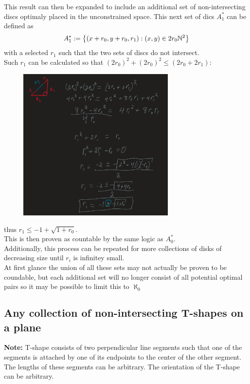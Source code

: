 \documentclass[]{article}
\newcommand{\N}{\mathbb{N}}
\begin{document}
\newpage
This result can then be expanded to include an additional set of non-intersecting discs 
optimaly placed in the unconstrained space. 
This next set of dics $A_1^*$ can be defined as
\begin{displaymath}
	A_1^* := \qty{(x + r_0, y + r_0, r_1) : (x,y) \in 2 r_0 \N^2}
\end{displaymath}
with a selected $r_1$ such that the two sets of discs do not intersect.\\
Such $r_1$ can be calculated so that $(2r_0)^2 + (2r_0)^2 \leq (2r_0 + 2 r_1)$:
\begin{figure}[h]
	\centering
	\includegraphics[width=0.7\textwidth]{fig/pblm4b_1.png}
\end{figure}
thus $r_1 \leq -1 + \sqrt{1 + r_0}$.\\
This is then proven as countable by the same logic as $A_0^*$.\\
Additionally, this process can be repeated for more collections of disks of decreasing size 
until $r_i$ is infinitey small.\\
At first glance the union of all these sets may not actually be proven to be coundable, 
but each additional set will no longer consist of all potential optimal pairs so it 
may be possible to limit this to $\aleph_0$



\newpage
\subsection{Any collection of non-intersecting T-shapes on a plane}
\textbf{Note:} T-shape consists of two perpendicular line segments such that 
one of the segments is attached by one of its endpoints to the center of the other segment. 
The lengths of these segments can be arbitrary. The orientation of the T-shape can be arbitrary.\\
\end{document}

